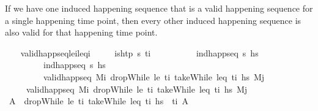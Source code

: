 \begin{isabellebody}
\begin{isamarkuptext}
  If we have one induced happening sequence that is a valid happening sequence for a 
  single happening time point, then every other induced happening sequence is also valid 
  for that happening time point.%
\end{isamarkuptext}\isamarkuptrue%
\ \ \isamarkupfalse%
\ valid{\isacharunderscore}{\kern0pt}happ{\isacharunderscore}{\kern0pt}seq{\isacharunderscore}{\kern0pt}le\isactrlsub i{\isacharunderscore}{\kern0pt}leq\isactrlsub i{\isacharcolon}{\kern0pt}\isanewline
\ \ \ \ \ {\isachardoublequoteopen}is{\isacharunderscore}{\kern0pt}htp\ {\isasympi}s\ t\isactrlsub i{\isachardoublequoteclose}\ \isanewline
\ \ \ \ \ \ \ \ \ {\isachardoublequoteopen}ind{\isacharunderscore}{\kern0pt}happ{\isacharunderscore}{\kern0pt}seq\ {\isasympi}s\ hs\ \isanewline
\ \ \ \ \ \ \ \ \ {\isachardoublequoteopen}ind{\isacharunderscore}{\kern0pt}happ{\isacharunderscore}{\kern0pt}seq\ {\isasympi}s\ hs\ \isanewline
\ \ \ \ \ \ \ \ \ {\isachardoublequoteopen}valid{\isacharunderscore}{\kern0pt}happ{\isacharunderscore}{\kern0pt}seq\ M\isactrlsub i\ {\isacharparenleft}{\kern0pt}dropWhile\ {\isacharparenleft}{\kern0pt}le\ t\isactrlsub i{\isacharparenright}{\kern0pt}\ {\isacharparenleft}{\kern0pt}takeWhile\ {\isacharparenleft}{\kern0pt}leq\ t\isactrlsub i{\isacharparenright}{\kern0pt}\ hs\ M\isactrlsub j{\isachardoublequoteclose}\isanewline
\ \ \ \ \ {\isachardoublequoteopen}valid{\isacharunderscore}{\kern0pt}happ{\isacharunderscore}{\kern0pt}seq\ M\isactrlsub i\ {\isacharparenleft}{\kern0pt}dropWhile\ {\isacharparenleft}{\kern0pt}le\ t\isactrlsub i{\isacharparenright}{\kern0pt}\ {\isacharparenleft}{\kern0pt}takeWhile\ {\isacharparenleft}{\kern0pt}leq\ t\isactrlsub i{\isacharparenright}{\kern0pt}\ hs\ M\isactrlsub j{\isachardoublequoteclose}\isanewline
%
\isadelimproof
\ \ %
\endisadelimproof
%
\isatagproof
{}\isamarkupfalse%
\ {\isacharminus}{\kern0pt}\isanewline
\ \ \ \ \isamarkupfalse%
\ A\ \ {\isachardoublequoteopen}dropWhile\ {\isacharparenleft}{\kern0pt}le\ t\isactrlsub i{\isacharparenright}{\kern0pt}\ {\isacharparenleft}{\kern0pt}takeWhile\ {\isacharparenleft}{\kern0pt}leq\ t\isactrlsub i{\isacharparenright}{\kern0pt}\ hs\ {\isacharequal}{\kern0pt}\ {\isacharbrackleft}{\kern0pt}{\isacharparenleft}{\kern0pt}t\isactrlsub i{\isacharcomma}{\kern0pt}\ A\isanewline

\end{isabellebody}
